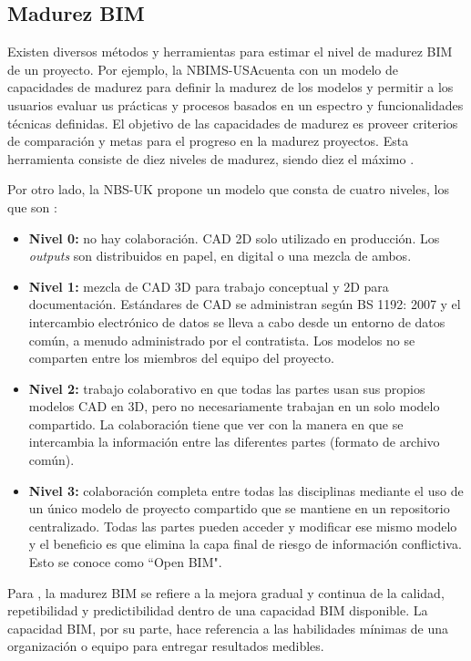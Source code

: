 \subsection{Madurez BIM} 

Existen diversos métodos y herramientas para estimar el nivel de madurez BIM de un proyecto. Por ejemplo, la NBIMS-USA\textregistered cuenta con un modelo de capacidades de madurez para definir la madurez de los modelos y permitir a los usuarios evaluar us prácticas y procesos basados en un espectro y funcionalidades técnicas definidas. El objetivo de las capacidades de madurez es proveer criterios de comparación y metas para el progreso en la madurez proyectos. Esta herramienta consiste de diez niveles de madurez, siendo diez el máximo \cite{trejo2018estudio}.

Por otro lado, la NBS-UK propone un modelo que consta de cuatro niveles, los que son \cite{trejo2018estudio}:


\begin{itemize}
    \item \textbf{Nivel 0:} no hay colaboración. CAD 2D solo utilizado en producción. Los \textit{outputs} son distribuidos en papel, en digital o una mezcla de ambos.
    \item \textbf{Nivel 1:} mezcla de CAD 3D para trabajo conceptual y 2D para documentación. Estándares de CAD se administran según BS 1192: 2007 y el intercambio electrónico de datos se lleva a cabo desde un entorno de datos común, a menudo administrado por el contratista. Los modelos no se comparten entre los miembros del equipo del proyecto.
    \item \textbf{Nivel 2:} trabajo colaborativo en que todas las partes usan sus propios modelos CAD en 3D, pero no necesariamente trabajan en un solo modelo compartido. La colaboración tiene que ver con la manera en que se intercambia la información entre las diferentes partes (formato de archivo común).
    \item \textbf{Nivel 3:} colaboración completa entre todas las disciplinas mediante el uso de un único modelo de proyecto compartido que se mantiene en un repositorio centralizado. Todas las partes pueden acceder y modificar ese mismo modelo y el beneficio es que elimina la capa final de riesgo de información conflictiva. Esto se conoce como ``Open BIM".
\end{itemize}

Para , la madurez BIM se refiere a la mejora gradual y continua de la calidad, repetibilidad y predictibilidad dentro de una capacidad BIM disponible. La capacidad BIM, por su parte, hace referencia a las habilidades mínimas de una organización o equipo para entregar resultados medibles.

